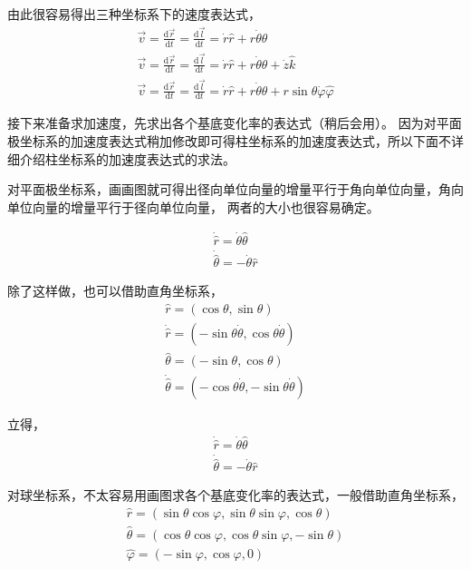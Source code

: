 \documentclass{ctexart}
\begin{document}
    由此很容易得出三种坐标系下的速度表达式，
    \begin{gather*}
        \vec{v} = \frac{\mathrm{d}\vec{r}}{\mathrm{d}t} = \frac{\mathrm{d}\vec{l}}{\mathrm{d}t} =
        \dot{r}\hat{r} + r\dot{\theta}\hat{\theta} \\
        \vec{v} = \frac{\mathrm{d}\vec{r}}{\mathrm{d}t} = \frac{\mathrm{d}\vec{l}}{\mathrm{d}t} =
        \dot{r}\hat{r} + r\dot{\theta}\hat{\theta} + \dot{z}\hat{k} \\
        \vec{v} = \frac{\mathrm{d}\vec{r}}{\mathrm{d}t} = \frac{\mathrm{d}\vec{l}}{\mathrm{d}t} =
        \dot{r}\hat{r} + r\dot{\theta}\hat{\theta} + r\sin\theta\dot{\varphi}\hat{\varphi}
    \end{gather*}

    接下来准备求加速度，先求出各个基底变化率的表达式（稍后会用）。
    因为对平面极坐标系的加速度表达式稍加修改即可得柱坐标系的加速度表达式，所以下面不详细介绍柱坐标系的加速度表达式的求法。

    对平面极坐标系，画画图就可得出径向单位向量的增量平行于角向单位向量，角向单位向量的增量平行于径向单位向量，
    两者的大小也很容易确定。

    \begin{gather*}
        \dot{\hat{r}} = \dot{\theta}\hat{\theta} \\
        \dot{\hat{\theta}} = -\dot{\theta}\hat{r}
    \end{gather*}

    除了这样做，也可以借助直角坐标系，
    \begin{gather*}
        \hat{r} = (\cos\theta,\sin\theta) \\
        \dot{\hat{r}} = (-\sin\theta\dot{\theta},\cos\theta\dot{\theta}) \\
        \hat{\theta} = (-\sin\theta,\cos\theta) \\
        \dot{\hat{\theta}} = (-\cos\theta\dot{\theta},-\sin\theta\dot{\theta})
    \end{gather*}

    立得，
    \begin{gather*}
        \dot{\hat{r}} = \dot{\theta}\hat{\theta} \\
        \dot{\hat{\theta}} = -\dot{\theta}\hat{r}
    \end{gather*}

    对球坐标系，不太容易用画图求各个基底变化率的表达式，一般借助直角坐标系，
    \begin{gather*}
        \hat{r} = (\sin\theta\cos\varphi,\sin\theta\sin\varphi,\cos\theta) \\
        \hat{\theta} = (\cos\theta\cos\varphi,\cos\theta\sin\varphi,-\sin\theta) \\
        \hat{\varphi} = (-\sin\varphi,\cos\varphi,0)
    \end{gather*}
\end{document}
